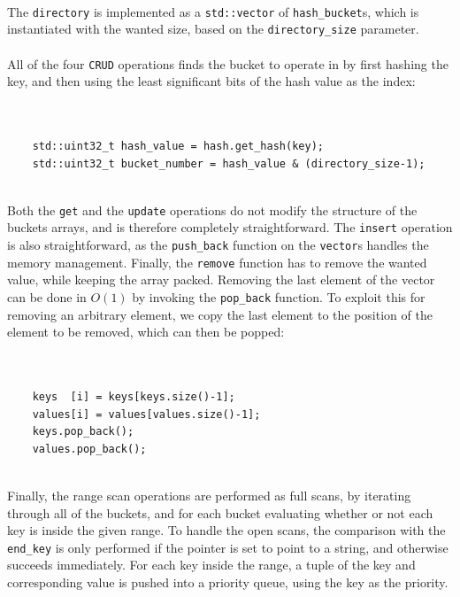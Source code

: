 \documentclass[11pt]{report} %
\begin{document}
\\
The \verb|directory| is implemented as a \verb|std::vector| of \verb|hash_bucket|s, which is instantiated with the wanted size, based on the \verb|directory_size| parameter.\\
\\
All of the four \verb|CRUD| operations finds the bucket to operate in by first hashing the key, and then using the least significant bits of the hash value as the index:\\
\\
\begin{fminipage}{\linewidth}
\begin{lstlisting}[]% Start your code-block

    std::uint32_t hash_value = hash.get_hash(key);
    std::uint32_t bucket_number = hash_value & (directory_size-1);
\end{lstlisting}
\end{fminipage}
\vphantom{fill}\\
Both the \verb|get| and the \verb|update| operations do not modify the structure of the buckets arrays, and is therefore completely straightforward. The \verb|insert| operation is also straightforward, as the \verb|push_back| function on the \verb|vector|s handles the memory management. Finally, the \verb|remove| function has to remove the wanted value, while keeping the array packed. Removing the last element of the vector can be done in $O(1)$ by invoking the \verb|pop_back| function. To exploit this for removing an arbitrary element, we copy the last element to the position of the element to be removed, which can then be popped:\\
\\
\begin{fminipage}{\linewidth}
\begin{lstlisting}[]% Start your code-block

    keys  [i] = keys[keys.size()-1];
    values[i] = values[values.size()-1];
    keys.pop_back();
    values.pop_back();
\end{lstlisting}
\end{fminipage}
\vphantom{fill}\\
Finally, the range scan operations are performed as full scans, by iterating through all of the buckets, and for each bucket evaluating whether or not each key is inside the given range. To handle the open scans, the comparison with the \verb|end_key| is only performed if the pointer is set to point to a string, and otherwise succeeds immediately. For each key inside the range, a tuple of the key and corresponding value is pushed into a priority queue, using the key as the priority.\\
\end{document}
